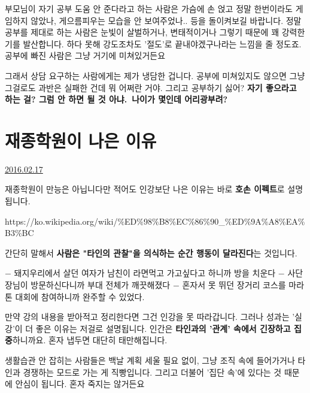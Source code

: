 부모님이 자기 공부 도움 안 준다라고 하는 사람은 가슴에 손 얹고
정말 한번이라도 게임하지 않았나, 게으름피우는 모습을 안 보여주었나.. 등을 돌이켜보길 바랍니다.
정말 공부를 제대로 하는 사람은 눈빛이 살벌하거나, 변태적이거나 그렇기 때문에 꽤 강력한 기를 발산합니다.
하다 못해 강도조차도 '절도'로 끝내야겠구나라는 느낌을 줄 정도죠. 공부에 빠진 사람은 그냥 거기에 미쳐있거든요
\vspace{5mm}

그래서 상담 요구하는 사람에게는 제가 냉담한 겁니다. 공부에 미쳐있지도 않으면 그냥 그걸로도 과반은 실패한 건데 뭐 어쩌란 거야.
그리고 공부하기 싫어? \textbf{자기 좋으라고 하는 걸? 그럼 안 하면 될 것 아냐. 나이가 몇인데 어리광부려?}
\vspace{5mm}







\section{재종학원이 나은 이유}
\href{https://www.kockoc.com/Apoc/640034}{2016.02.17}

\vspace{5mm}

재종학원이 만능은 아닙니다만 적어도 인강보단 나은 이유는
바로 \textbf{호손 이펙트}로 설명됩니다.
\vspace{5mm}

https://ko.wikipedia.org/wiki/$\%$ED$\%$98$\%$B8$\%$EC$\%$86$\%$90_$\%$ED$\%$9A$\%$A8$\%$EA$\%$B3$\%$BC
\vspace{5mm}

간단히 말해서 \textbf{사람은 "타인의 관찰"을 의식하는 순간 행동이 달라진다}는 것입니다.
\vspace{5mm}

$-$ 돼지우리에서 살던 여자가 남친이 라면먹고 가고싶다고 하니까 방을 치운다
$-$ 사단장님이 방문하신다니까 부대 전체가 깨끗해졌다
$-$ 혼자서 못 뛰던 장거리 코스를 마라톤 대회에 참여하니까 완주할 수 있었다.
\vspace{5mm}

만약 강의 내용을 받아적고 정리한다면 그건 인강을 못 따라갑니다.
그러나 성과는 '실강'이 더 좋은 이유는 저걸로 설명됩니다.
인간은 \textbf{타인과의 '관계' 속에서 긴장하고 집중}하니까요. 혼자 냅두면 대단히 태만해집니다.
\vspace{5mm}

생활습관 안 잡히는 사람들은 백날 계획 세울 필요 없이,
그냥 조직 속에 들어가거나 타인과 경쟁하는 모드로 가는 게 직빵입니다.
그리고 더불어 '집단 속'에 있다는 것 때문에 안심이 됩니다. 혼자 죽지는 않거든요
\vspace{5mm}


